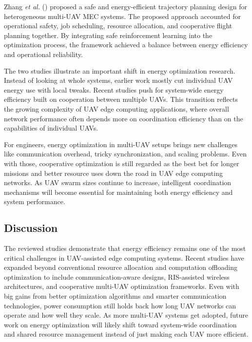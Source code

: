 \documentclass[a4paper, 12pt]{article}
\begin{document}
Zhang \textit{et al.} (\cite{Zhang2026Safe}) proposed a safe and energy-efficient trajectory planning design for heterogeneous multi-UAV MEC systems. The proposed approach accounted for operational safety, job scheduling, resource allocation, and cooperative flight planning together. By integrating safe reinforcement learning into the optimization process, the framework achieved a balance between energy efficiency and operational reliability.

The two studies illustrate an important shift in energy optimization research. Instead of looking at whole systems, earlier work mostly cut individual UAV energy use with local tweaks. Recent studies push for system-wide energy efficiency built on cooperation between multiple UAVs. This transition reflects the growing complexity of UAV edge computing applications, where overall network performance often depends more on coordination efficiency than on the capabilities of individual UAVs.

For engineers, energy optimization in multi-UAV setups brings new challenges like communication overhead, tricky synchronization, and scaling problems. Even with those, cooperative optimization is still regarded as the best bet for longer missions and better resource uses down the road in UAV edge computing networks. As UAV swarm sizes continue to increase, intelligent coordination mechanisms will become essential for maintaining both energy efficiency and system performance.

\subsection*{Discussion}
The reviewed studies demonstrate that energy efficiency remains one of the most critical challenges in UAV-assisted edge computing systems. Recent studies have expanded beyond conventional resource allocation and computation offloading optimization to include communication-aware designs, RIS-assisted wireless architectures, and cooperative multi-UAV optimization frameworks. Even with big gains from better optimization algorithms and smarter communication technologies, power consumption still holds back how long UAV networks can operate and how well they scale. As more multi-UAV systems get adopted, future work on energy optimization will likely shift toward system-wide coordination and shared resource management instead of just making each UAV more efficient.
\end{document}
